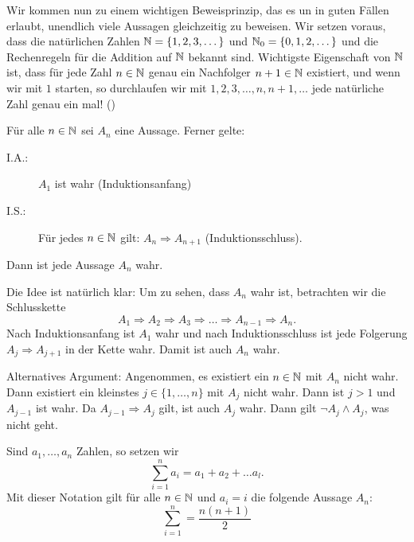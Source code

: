 Wir kommen nun zu einem wichtigen Beweisprinzip, das es un in guten Fällen erlaubt, unendlich viele Aussagen gleichzeitig zu beweisen. Wir setzen voraus, dass die natürlichen Zahlen $\mathbb{N} = \{1,2,3,\dots\}$ und $\mathbb{N}_0 = \{0,1,2,\dots\}$ und die Rechenregeln für die Addition auf $\mathbb{N}$ bekannt sind.
Wichtigste Eigenschaft von $\mathbb{N}$ ist, dass für jede Zahl $n \in \mathbb{N}$ genau ein Nachfolger $n+1 \in \mathbb{N}$ existiert, und wenn wir mit $1$ starten, so durchlaufen wir mit $1,2,3,\dots, n, n+1, \dots$ jede natürliche Zahl genau ein mal! ()

\newpage

\begin{satz}
	\label{satz:I.1.8}
	Für alle $n \in \mathbb{N}$ sei $A_n$ eine Aussage. 
	Ferner gelte:
	\begin{description}
		\item[I.A.:] $A_1$ ist wahr (Induktionsanfang)
		\item[I.S.:] Für jedes $n \in \mathbb{N}$ gilt: $A_n \Rightarrow A_{n+1}$ (Induktionsschluss).
	\end{description}
	Dann ist jede Aussage $A_n$ wahr.
\end{satz}

Die Idee ist natürlich klar:
Um zu sehen, dass $A_n$ wahr ist, betrachten wir die Schlusskette
\[
	A_1 \Rightarrow A_2 \Rightarrow A_3 \Rightarrow \dots \Rightarrow A_{n-1} \Rightarrow A_n.
\]
Nach Induktionsanfang ist $A_1$ wahr und nach Induktionsschluss ist jede Folgerung $A_j \Rightarrow A_{j+1}$ in der Kette wahr.
Damit ist auch $A_n$ wahr.

Alternatives Argument:
Angenommen, es existiert ein $n \in \mathbb{N}$ mit $A_n$ nicht wahr.
Dann existiert ein kleinstes $j \in \{1,\dots,n\}$ mit $A_j$ nicht wahr.
Dann ist $j > 1 $ und $A_{j-1}$ ist wahr.
Da $A_{j-1} \Rightarrow A_j$ gilt, ist auch $A_j$ wahr.
Dann gilt $\neg A_j \wedge A_j$, was nicht geht.

\begin{beispiel}
	\label{bsp:I.1.9}
	Sind $a_1,\dots,a_n$ Zahlen, so setzen wir
	\[
		\sum_{i=1}^{n} a_i = a_1 + a_2 + \dots a_l.
	\]
	Mit dieser Notation gilt für alle $n \in \mathbb{N}$ und $a_i = i$ die folgende Aussage $A_n$:
	\[
		\sum_{i=1}^{n} = \frac{n(n+1)}{2}
	\]
\end{beispiel}

